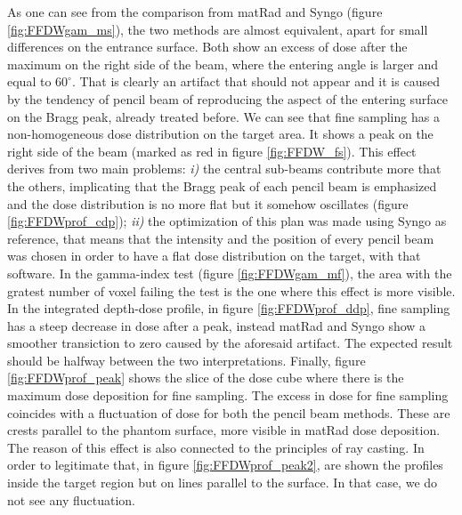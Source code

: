 \documentclass[12pt, a4paper, twoside]{book}
\begin{document}
As one can see from the comparison from matRad and Syngo (figure \ref{fig:FFDWgam_ms}), the two methods are almost equivalent, apart for small differences on the entrance surface. Both show an excess of dose after the maximum on the right side of the beam, where the entering angle is larger and equal to $60^\circ$. That is clearly an artifact that should not appear and it is caused by the tendency of pencil beam of reproducing the aspect of the entering surface on the Bragg peak, already treated before.
We can see that fine sampling has a non-homogeneous dose distribution on the target area. It shows a peak on the right side of the beam (marked as red in figure \ref{fig:FFDW_fs}). This effect derives from two main problems: \emph{i)} the central sub-beams contribute more that the others, implicating that the Bragg peak of each pencil beam is emphasized and the dose distribution is no more flat but it somehow oscillates (figure \ref{fig:FFDWprof_cdp}); \emph{ii)} the optimization of this plan was made using Syngo as reference, that means that the intensity and the position of every pencil beam was chosen in order to have a flat dose distribution on the target, with that software.
In the gamma-index test (figure \ref{fig:FFDWgam_mf}), the area with the gratest number of voxel failing the test is the one where this effect is more visible.
In the integrated depth-dose profile, in figure \ref{fig:FFDWprof_ddp}, fine sampling has a steep decrease in dose after a peak, instead matRad and Syngo show a smoother transiction to zero caused by the aforesaid artifact. The expected result should be halfway between the two interpretations.
Finally, figure \ref{fig:FFDWprof_peak} shows the slice of the dose cube where there is the maximum dose deposition  for fine sampling. The excess in dose for fine sampling coincides with a fluctuation of dose for both the pencil beam methods. These are crests parallel to the phantom surface, more visible in matRad dose deposition. The reason of this effect is also connected to the principles of ray casting. In order to legitimate that, in figure \ref{fig:FFDWprof_peak2}, are shown the profiles inside the target region but on lines parallel to the surface. In that case, we do not see any fluctuation.
\end{document}
